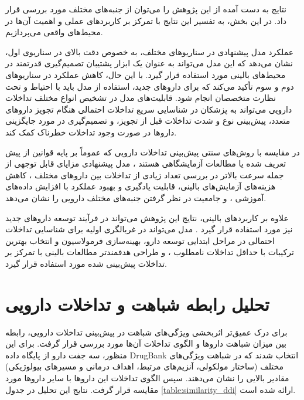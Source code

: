 نتایج به دست آمده از این پژوهش را می‌توان از جنبه‌های مختلف مورد بررسی قرار داد. در این بخش، به تفسیر این نتایج با تمرکز بر کاربردهای عملی و اهمیت آن‌ها در محیط‌های واقعی می‌پردازیم.

عملکرد مدل پیشنهادی در سناریوهای مختلف، به خصوص دقت بالای  در سناریوی اول، نشان می‌دهد که این مدل می‌تواند به عنوان یک ابزار پشتیبان تصمیم‌گیری قدرتمند در محیط‌های بالینی مورد استفاده قرار گیرد. با این حال، کاهش عملکرد در سناریوهای دوم و سوم تأکید می‌کند که برای داروهای جدید، استفاده از مدل باید با احتیاط و تحت نظارت متخصصان انجام شود. قابلیت‌های مدل در تشخیص انواع مختلف تداخلات دارویی می‌تواند به پزشکان در شناسایی سریع تداخلات احتمالی هنگام تجویز داروهای متعدد، پیش‌بینی نوع و شدت تداخلات قبل از تجویز، و تصمیم‌گیری در مورد جایگزینی داروها در صورت وجود تداخلات خطرناک کمک کند.

در مقایسه با روش‌های سنتی پیش‌بینی تداخلات دارویی که عموماً بر پایه قوانین از پیش تعریف شده یا مطالعات آزمایشگاهی هستند \cite{ref_glintborg2005}، مدل پیشنهادی مزایای قابل توجهی از جمله سرعت بالاتر در بررسی تعداد زیادی از تداخلات بین داروهای مختلف \cite{ref_cascorbi2012}، کاهش هزینه‌های آزمایش‌های بالینی، قابلیت یادگیری و بهبود عملکرد با افزایش داده‌های آموزشی \cite{ref_he2023}، و جامعیت در نظر گرفتن جنبه‌های مختلف دارویی را نشان می‌دهد.

علاوه بر کاربردهای بالینی، نتایج این پژوهش می‌تواند در فرآیند توسعه داروهای جدید نیز مورد استفاده قرار گیرد \cite{ref_ryu2018}. مدل می‌تواند در غربالگری اولیه برای شناسایی تداخلات احتمالی در مراحل ابتدایی توسعه دارو، بهینه‌سازی فرمولاسیون و انتخاب بهترین ترکیبات با حداقل تداخلات نامطلوب \cite{ref_huang2013}، و طراحی هدفمندتر مطالعات بالینی با تمرکز بر تداخلات پیش‌بینی شده مورد استفاده قرار گیرد.

\section{تحلیل رابطه شباهت و تداخلات دارویی}

برای درک عمیق‌تر اثربخشی ویژگی‌های شباهت در پیش‌بینی تداخلات دارویی، رابطه بین میزان شباهت داروها و الگوی تداخلات آن‌ها مورد بررسی قرار گرفت. برای این منظور، سه جفت دارو از پایگاه داده DrugBank انتخاب شدند که در شباهت ویژگی‌های مختلف (ساختار مولکولی، آنزیم‌های مرتبط، اهداف درمانی و مسیرهای بیولوژیکی) مقادیر بالایی را نشان می‌دهند. سپس الگوی تداخلات این داروها با سایر داروها مورد مقایسه قرار گرفت. نتایج این تحلیل در جدول \ref{table:similarity_ddi} ارائه شده است.

